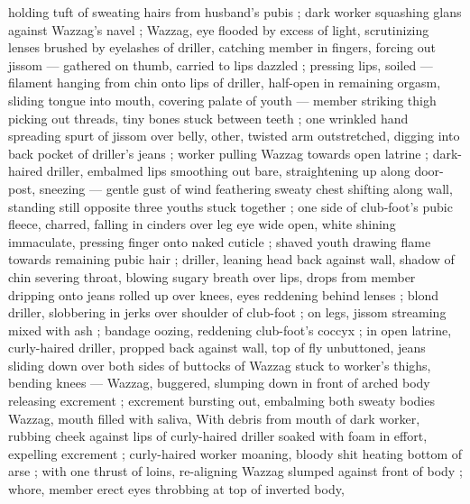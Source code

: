 holding tuft of sweating hairs from husband's pubis ; dark worker squashing glans against Wazzag's navel ; Wazzag, eye flooded by excess of light, scrutinizing lenses brushed by eyelashes of driller, catching member in fingers, forcing out jissom --- gathered on thumb, carried to lips {\dashcom} dazzled ; pressing lips, soiled --- filament hanging from chin {\dashcom} onto lips of driller, half-open in remaining orgasm, sliding tongue into mouth, covering palate of youth --- member striking thigh {\dashcom} picking out threads, tiny bones stuck between teeth ; one wrinkled hand spreading spurt of jissom over belly, other, twisted arm outstretched, digging into back pocket of driller's jeans ; worker pulling Wazzag towards open latrine ; dark-haired driller, embalmed lips smoothing out bare, straightening up along door-post, sneezing --- gentle gust of wind feathering sweaty chest {\dashcom} shifting along wall, standing still opposite three youths stuck together ; one side of club-foot's pubic fleece, charred, falling in cinders over leg {\col} eye wide open, white shining immaculate, pressing finger onto naked cuticle ; shaved youth drawing flame towards remaining pubic hair ; driller, leaning head back against wall, shadow of chin severing throat, blowing sugary breath over lips, drops from member dripping onto jeans rolled up over knees, eyes reddening behind lenses  ; blond driller, slobbering in jerks over shoulder of club-foot ; on legs, jissom streaming mixed with ash ; bandage oozing, reddening club-foot's coccyx ; in open latrine, curly-haired driller, propped back against wall, top of fly unbuttoned, jeans sliding down over both sides of buttocks of Wazzag stuck to worker's thighs, bending knees --- Wazzag, buggered, slumping down in front of arched body {\dashcol} releasing excrement ; excrement bursting out, embalming both sweaty bodies {\col} Wazzag, mouth filled with saliva, With debris from mouth of dark worker, rubbing cheek against lips of curly-haired driller soaked with foam in effort, expelling excrement ; curly-haired worker moaning, bloody shit heating bottom of arse ; with one thrust of loins, re-aligning Wazzag slumped against front of body ; whore, member erect eyes throbbing at top of inverted body, 
